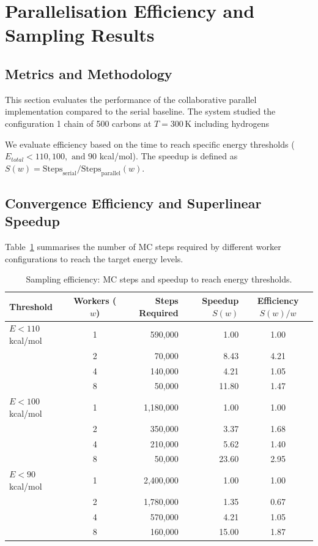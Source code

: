 \documentclass[11pt, a4paper]{article}
\begin{document}
\newpage
\section{Parallelisation Efficiency and Sampling Results}
\label{sec:efficiency}

\subsection{Metrics and Methodology}

This section evaluates the performance of the collaborative parallel implementation compared to the serial baseline. The system studied the configuration 1 chain of 500 carbons at $T = 300\,\text{K}$ including hydrogens 

We evaluate efficiency based on the time to reach specific energy thresholds ($E_{total} < 110, 100, \text{ and } 90$ kcal/mol). The speedup is defined as $S(w) = \text{Steps}_{\text{serial}} / \text{Steps}_{\text{parallel}}(w)$.

\subsection{Convergence Efficiency and Superlinear Speedup}

Table~\ref{tab:energy_thresholds} summarises the number of MC steps required by different worker configurations to reach the target energy levels.

\begin{table}[ht]
\centering
\caption{Sampling efficiency: MC steps and speedup to reach energy thresholds.}
\label{tab:energy_thresholds}
\begin{tabular}{lcrrc}
\toprule
Threshold & Workers ($w$) & Steps Required & Speedup $S(w)$ & Efficiency $S(w)/w$ \\
\midrule
$E < 110$ kcal/mol & 1 & 590,000 & 1.00 & 1.00 \\
                   & 2 & 70,000  & 8.43 & 4.21 \\
                   & 4 & 140,000 & 4.21 & 1.05 \\
                   & 8 & 50,000  & 11.80 & 1.47 \\
\midrule
$E < 100$ kcal/mol & 1 & 1,180,000 & 1.00 & 1.00 \\
                   & 2 & 350,000   & 3.37 & 1.68 \\
                   & 4 & 210,000   & 5.62 & 1.40 \\
                   & 8 & 50,000    & 23.60 & 2.95 \\
\midrule
$E < 90$ kcal/mol  & 1 & 2,400,000 & 1.00 & 1.00 \\
                   & 2 & 1,780,000 & 1.35 & 0.67 \\
                   & 4 & 570,000   & 4.21 & 1.05 \\
                   & 8 & 160,000   & 15.00 & 1.87 \\
\bottomrule
\end{tabular}
\end{table}
\end{document}
